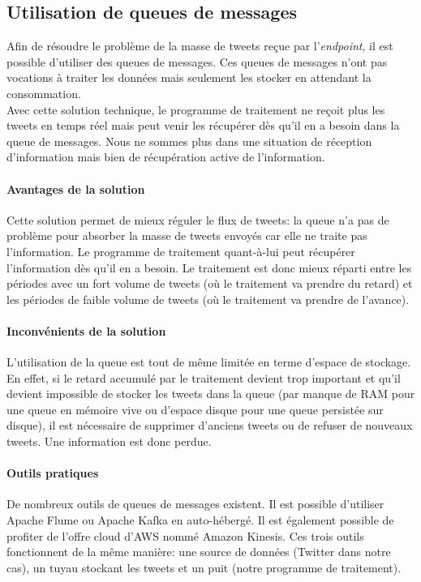 \subsection{Utilisation de queues de messages}
\label{sub:Utilisation de queues de messages}

  Afin de résoudre le problème de la masse de tweets reçue par l'\textit{endpoint}, il est possible d'utiliser des queues de messages. Ces queues de messages n'ont pas vocations à traiter les données mais seulement les stocker en attendant la consommation.\\

  Avec cette solution technique, le programme de traitement ne reçoit plus les tweets en temps réel mais peut venir les récupérer dès qu'il en a besoin dans la queue de messages. Nous ne sommes plus dans une situation de réception d'information mais bien de récupération active de l'information.\\

  \paragraph{Avantages de la solution}
  Cette solution permet de mieux réguler le flux de tweets: la queue n'a pas de problème pour absorber la masse de tweets envoyés car elle ne traite pas l'information. Le programme de traitement quant-à-lui peut récupérer l'information dès qu'il en a besoin. Le traitement est donc mieux réparti entre les périodes avec un fort volume de tweets (où le traitement va prendre du retard) et les périodes de faible volume de tweets (où le traitement va prendre de l'avance).

  \paragraph{Inconvénients de la solution}
  L'utilisation de la queue est tout de même limitée en terme d'espace de stockage. En effet, si le retard accumulé par le traitement devient trop important et qu'il devient impossible de stocker les tweets dans la queue (par manque de RAM pour une queue en mémoire vive ou d'espace disque pour une queue persistée sur disque), il est nécessaire de supprimer d'anciens tweets ou de refuser de nouveaux tweets. Une information est donc perdue.

  \paragraph{Outils pratiques}
  De nombreux outils de queues de messages existent. Il est possible d'utiliser Apache Flume ou Apache Kafka en auto-hébergé. Il est également possible de profiter de l'offre cloud d'AWS nommé Amazon Kinesis. Ces trois outils fonctionnent de la même manière: une source de données (Twitter dans notre cas), un tuyau stockant les tweets et un puit (notre programme de traitement).\\

